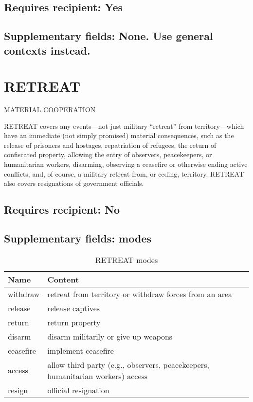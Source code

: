 \documentclass[11pt]{report}
\newcommand{\plcat}[1]{\textsf{#1}}
\begin{document}
\subsection{Requires recipient: Yes}

\subsection{Supplementary fields: None. Use general contexts instead.}

\section{RETREAT}

\textsf{MATERIAL COOPERATION} \vspace{8pt}


\plcat{RETREAT} covers any events---not just military ``retreat'' from territory---which have an immediate (not simply promised) material consequences, such as the release of prisoners and hostages, repatriation of refugees, the return of  confiscated property, allowing the entry of observers, peacekeepers, or humanitarian workers, disarming, observing a ceasefire or otherwise ending active conflicts, and, of course, a military retreat from, or ceding, territory. \plcat{RETREAT} also covers resignations of government officials.

\subsection{Requires recipient: No}

\subsection{Supplementary fields: modes}

\begin{table}[htp]
\caption{RETREAT modes}
\begin{center}
\begin{tabular}{|l|p{13cm}|}
\hline
Name & Content \\
\hline
withdraw & retreat from territory or withdraw forces from an area\\
release & release captives \\
return & return property \\
disarm & disarm militarily or give up weapons\\ 
ceasefire & implement ceasefire\\
access & allow third party (e.g., observers, peacekeepers, humanitarian workers) access \\
resign & official resignation \\
\hline
\end{tabular}
\end{center}
\label{tab:retreatmode}
\end{table}%
\end{document}
